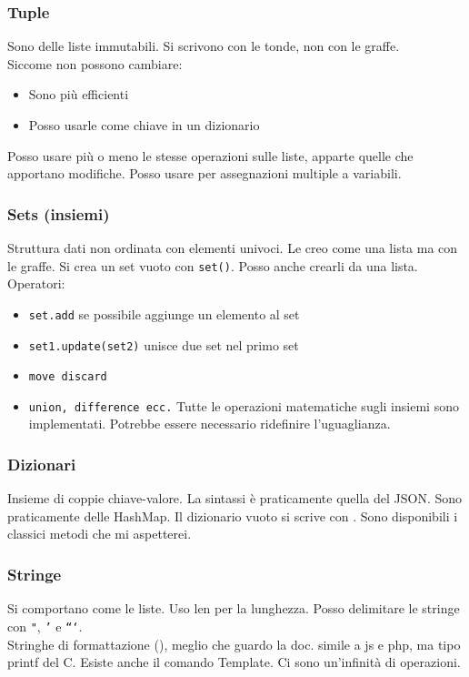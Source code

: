 \documentclass[a4paper,12pt]{article}
\newcommand{\pyRef}[1]{{\color{blue}{DIP pg#1}}}
\begin{document}
\subsubsection{Tuple}
Sono delle liste immutabili. Si scrivono con le tonde, non con le graffe.\\
Siccome non possono cambiare:
\begin{itemize}
 \item Sono più efficienti
 \item Posso usarle come chiave in un dizionario
\end{itemize}
Posso usare più o meno le stesse operazioni sulle liste, apparte quelle che apportano modifiche. Posso usare per assegnazioni multiple a variabili.

\subsubsection{Sets (insiemi)}
Struttura dati non ordinata con elementi univoci. Le creo come una lista ma con le graffe. Si crea un set vuoto con \texttt{set()}. Posso anche crearli da una lista.
Operatori:
\begin{itemize}
	\item \texttt{set.add} se possibile aggiunge un elemento al set
	\item \texttt{set1.update(set2)} unisce due set nel primo set
	\item \texttt{move discard}
	\item \texttt{union, difference ecc.} Tutte le operazioni matematiche sugli insiemi sono implementati. Potrebbe essere necessario ridefinire l'uguaglianza.
\end{itemize}

\subsubsection{Dizionari}
Insieme di coppie chiave-valore. La sintassi è praticamente quella del JSON. Sono praticamente delle HashMap. Il dizionario vuoto si scrive con \texttt{{}}. Sono disponibili i classici metodi che mi aspetterei.

\subsubsection{Stringe}
Si comportano come le liste. Uso len per la lunghezza. Posso delimitare le stringe con \texttt{"}, \texttt{'} e \texttt{```}.\\
Stringhe di formattazione (\pyRef{114}), meglio che guardo la doc. \E simile a js e php, ma tipo printf del C. Esiste anche il comando Template. Ci sono un'infinità di operazioni.
\end{document}
